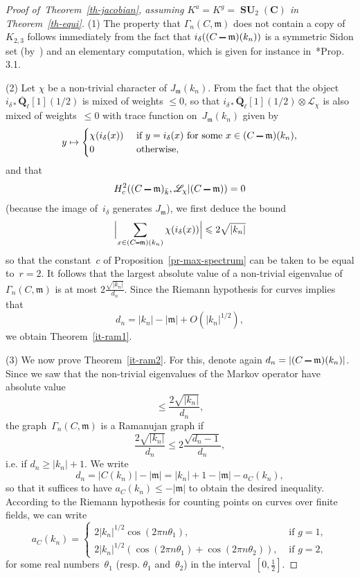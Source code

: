 \documentclass[12pt]{amsart}
\renewcommand{\leq}{\leqslant}
\renewcommand{\geq}{\geqslant}
\numberwithin{equation}{section}
\def\setminus{\mathchoice
    {\mathbin{\vrule height .62ex width 1.61ex depth -.38ex}}%
    {\mathbin{\vrule height .62ex width 1.61ex depth -.38ex}}%
    {\mathbin{\vrule height .50ex width 0.85ex depth -.28ex}}%
    {\mathbin{\vrule height .20ex width 0.570ex depth -.24ex}}%
}
\newcommand{\Cc}{\mathbf{C}}
\newcommand{\Qq}{\mathbf{Q}}
\newcommand{\bQl}{\overline{\Qq}_{\ell}}
\newcommand{\mfm}{\mathfrak{m}}
\DeclareMathOperator{\SU}{\mathbf{SU}}
\newcommand{\demi}{{\textstyle{\frac{1}{2}}}}
\theoremstyle{plain}
\theoremstyle{remark}
\theoremstyle{definition}
\newcommand{\mcL}{\mathscr{L}}
\renewcommand{\geq}{\geqslant}
\renewcommand{\leq}{\leqslant}
\begin{document}
\begin{proof}[Proof of~Theorem~\ref{th-jacobian}, assuming
  $K^a=K^g=\SU_2(\Cc)$ in Theorem~\ref{th-equi}]
  \phantom{}
  \par
  (1) The property that $\Gamma_n(C,\mfm)$ does not contain a copy of
  $K_{2,3}$ follows immediately from the fact that
  $i_{\delta}((C\setminus \mfm)(k_n))$ is a symmetric Sidon set
  (by~\cite{ffk2}) and an elementary computation, which is given for
  instance in~\cite{short}*{Prop.\,3.1}.
  
  (2) Let $\chi$ be a non-trivial character of $J_{\mfm}(k_n)$. From
  the fact that the object $i_{\delta*}\bQl[1](1/2)$ is mixed of
  weights $\leq 0$, so that $i_{\delta*}\bQl[1](1/2)\otimes
  \mcL_{\chi}$ is also mixed of weights~$\leq 0$ with trace function
  on~$J_{\mfm}(k_n)$ given by
  \[
    y\mapsto \begin{cases} \chi(i_{\delta}(x)) &\text{ if }
      y=i_{\delta}(x)\text{ for some } x\in (C\setminus \mfm)(k_n),
      \\
      0&\text{ otherwise},
    \end{cases}
  \]
  and that
  \[
    H^2_c((C\setminus\mfm)_{\bar{k}},\mcL_{\chi}|(C\setminus\mfm))=0
  \]
  (because the image of~$i_{\delta}$ generates $J_{\mfm}$), we first
  deduce the bound
  \[
    \Bigl|\sum_{x\in (C\setminus\mfm)(k_n)}\chi(i_{\delta}(x))
    \Bigr|\leq 2\sqrt{|k_n|}
  \]
so that the constant~$c$ of
  Proposition~\ref{pr-max-spectrum} can be taken to be equal to~$r=2$.
  It follows that the largest absolute value of a non-trivial
  eigenvalue of $\Gamma_n(C,\mfm)$ is at most
  $2\frac{\sqrt{|k_n|}}{d_n}$.  Since the Riemann hypothesis for curves
  implies that
  \[
    d_n=|k_n|-|\mfm|+O(|k_n|^{1/2}),
  \]
  we obtain Theorem~\ref{it-ram1}.

  (3) We now prove Theorem~\ref{it-ram2}. For this, denote again
  $d_n=|(C\setminus\mfm)(k_n)|$. Since we saw that the non-trivial
  eigenvalues of the Markov operator have absolute value
  \[
    \leq \frac{2\sqrt{|k_n|}}{d_n},
  \]
  the graph~$\Gamma_n(C,\mfm)$ is a Ramanujan graph if
  \[
    \frac{2\sqrt{|k_n|}}{d_n}\leq 2\frac{\sqrt{d_n-1}}{d_n},
  \]
  i.e. if $d_n\geq |k_n|+1$. We write
  \[
    d_n=|C(k_n)|-|\mfm|=|k_n|+1-|\mfm|-a_C(k_n),
  \]
  so that it suffices to have $a_C(k_n)\leq -|\mfm|$ to obtain the
  desired inequality. According to the Riemann hypothesis for counting
  points on curves over finite fields, we can write
  \[
    a_C(k_n)=
    \begin{cases}
      2|k_n|^{1/2}\cos(2\pi n\theta_1),&\text{ if }
      g=1,\\
      2|k_n|^{1/2}(\cos(2\pi n\theta_1)+\cos(2\pi n\theta_2)),& \text{ if
      } g=2,
    \end{cases}
  \]
  for some real numbers~$\theta_1$ (resp. $\theta_1$ and~$\theta_2$)
  in the interval~$[0,\demi]$.
  

\end{proof}
\end{document}
